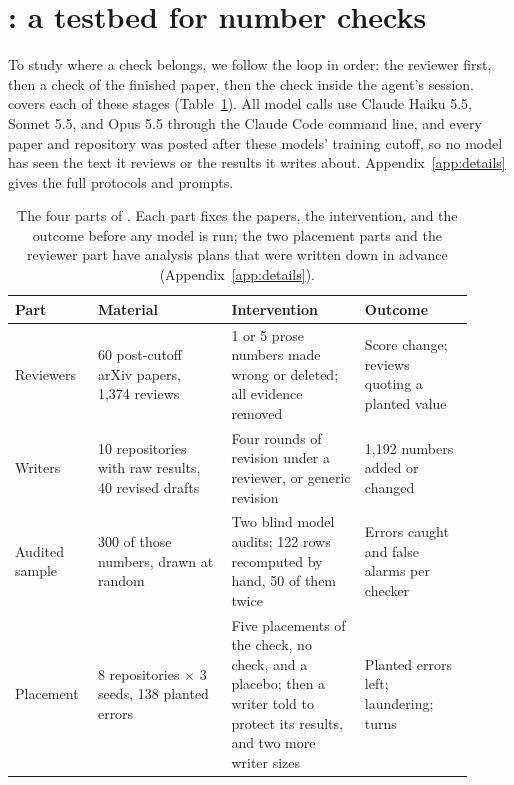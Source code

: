 \section{\bench{}: a testbed for number checks}
\label{sec:setup}

To study where a check belongs, we follow the loop in order: the reviewer first, then a check of the finished paper,
then the check inside the agent's session. \bench{} covers each of these stages (Table~\ref{tab:bench}). All model calls use
Claude Haiku 5.5, Sonnet 5.5, and Opus 5.5 through the Claude Code command line, and every paper and repository was
posted after these models' training cutoff, so no model has seen the text it reviews or the results it writes about.
Appendix~\ref{app:details} gives the full protocols and prompts.

\begin{table}[t]
  \centering
  \caption{The four parts of \bench{}. Each part fixes the papers, the intervention, and the outcome before any model
  is run; the two placement parts and the reviewer part have analysis plans that were written down in advance
  (Appendix~\ref{app:details}).}
  \label{tab:bench}
  \small
  \setlength{\tabcolsep}{5pt}
  \begin{tabular}{@{}p{0.15\linewidth}p{0.27\linewidth}p{0.27\linewidth}p{0.22\linewidth}@{}}
    \toprule
    \rowcolor{headgray}
    Part & Material & Intervention & Outcome \\
    \midrule
    Reviewers & 60 post-cutoff arXiv papers, 1,374 reviews & 1 or 5 prose numbers made wrong or deleted; all
    evidence removed & Score change; reviews quoting a planted value \\
    Writers & 10 repositories with raw results, 40 revised drafts & Four rounds of revision under a reviewer, or
    generic revision & 1,192 numbers added or changed \\
    Audited sample & 300 of those numbers, drawn at random & Two blind model audits; 122 rows recomputed by hand, 50
    of them twice & Errors caught and false alarms per checker \\
    Placement & 8 repositories $\times$ 3 seeds, 138 planted errors & Five placements of the check, no check, and a placebo; then a writer
    told to protect its results, and two more writer sizes & Planted errors left; laundering; turns \\
    \bottomrule
  \end{tabular}
\end{table}

